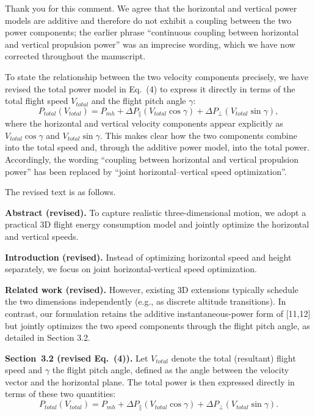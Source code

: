 \begin{revresponse}[]
	Thank you for this comment. We agree that the horizontal and vertical power models are additive and therefore do not exhibit a coupling between the two power components; the earlier phrase ``continuous coupling between horizontal and vertical propulsion power'' was an imprecise wording, which we have now corrected throughout the manuscript.

	To state the relationship between the two velocity components precisely, we have revised the total power model in Eq.~(4) to express it directly in terms of the total flight speed $V_{total}$ and the flight pitch angle $\gamma$:
	\[
		P_{total}(V_{total}) = P_{mh} + \Delta P_{\parallel}(V_{total}\cos\gamma) + \Delta P_{\perp}(V_{total}\sin\gamma),
	\]
	where the horizontal and vertical velocity components appear explicitly as $V_{total}\cos\gamma$ and $V_{total}\sin\gamma$. This makes clear how the two components combine into the total speed and, through the additive power model, into the total power. Accordingly, the wording ``coupling between horizontal and vertical propulsion power'' has been replaced by ``joint horizontal--vertical speed optimization''.

	The revised text is as follows.
	\begin{changes}
		\textbf{Abstract (revised).} To capture realistic three-dimensional motion, we adopt a practical 3D flight energy consumption model and jointly optimize the horizontal and vertical speeds.

		\textbf{Introduction (revised).} Instead of optimizing horizontal speed and height separately, we focus on joint horizontal-vertical speed optimization.

		\textbf{Related work (revised).} However, existing 3D extensions typically schedule the two dimensions independently (e.g., as discrete altitude transitions). In contrast, our formulation retains the additive instantaneous-power form of [11,12] but jointly optimizes the two speed components through the flight pitch angle, as detailed in Section 3.2.

		\textbf{Section~3.2 (revised Eq.~(4)).} Let $V_{total}$ denote the total (resultant) flight speed and $\gamma$ the flight pitch angle, defined as the angle between the velocity vector and the horizontal plane. The total power is then expressed directly in terms of these two quantities:
		\[
			P_{total}(V_{total}) = P_{mh} + \Delta P_{\parallel}(V_{total}\cos\gamma) + \Delta P_{\perp}(V_{total}\sin\gamma).
		\]
	\end{changes}
\end{revresponse}

